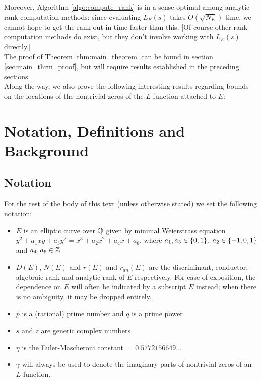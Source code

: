 \documentclass[10pt]{article}
\newcommand{\Les}{L_E(s)}
\begin{document}
Moreover, Algorithm \ref{algo:compute_rank} is in a sense optimal among analytic rank computation methods: since evaluating $\Les$ takes $\tilde{O}(\sqrt{N_E})$ time, we cannot hope to get the rank out in time faster than this. [Of course other rank computation methods do exist, but they don't involve working with $\Les$ directly.] \\

The proof of Theorem \ref{thm:main_theorem} can be found in section \ref{sec:main_thrm_proof}, but will require results established in the preceding sections. \\

Along the way, we also prove the following interesting results regarding bounds on the locations of the nontrivial zeros of the $L$-function attached to $E$:


\newpage
\section{Notation, Definitions and Background}\label{sec:defs_background}

\subsection{Notation}\label{subsec:notation}

For the rest of the body of this text (unless otherwise stated) we set the following notation:
\begin{itemize}
\item $E$ is an elliptic curve over $\mathbb{Q}$ given by minimal Weierstrass equation $y^2 + a_1 xy + a_3 y^2 = x^3 + a_2 x^2 + a_4 x + a_6$, where $a_1, a_3 \in \left\{0,1\right\}$, $a_2 \in \left\{-1,0,1\right\}$ and $a_4,a_6 \in \mathbb{Z}$
\item $D(E)$, $N(E)$ and $r(E)$  and $r_{an}(E)$ are the discriminant, conductor, algebraic rank and analytic rank of $E$ respectively. For ease of exposition, the dependence on $E$ will often be indicated by a subscript $E$ instead; when there is no ambiguity, it may be dropped entirely.
\item $p$ is a (rational) prime number and $q$ is a prime power
\item $s$ and $z$ are generic complex numbers
\item $\eta$ is the Euler-Mascheroni constant $= 0.5772156649\ldots$
\item $\gamma$ will always be used to denote the imaginary parts of nontrivial zeros of an $L$-function. \\
\end{itemize}
\end{document}
